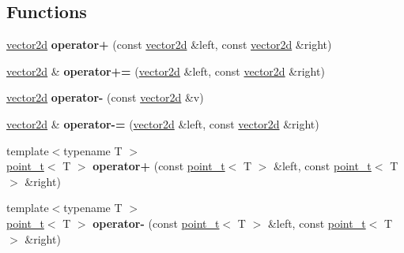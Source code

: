 \subsection*{Functions}
\begin{DoxyCompactItemize}
\item 
\mbox{\label{namespacetwod_a20bdf2e9aa199bd27066feded5ebbf88}} 
\hyperlink{structtwod_1_1vector2d}{vector2d} {\bfseries operator+} (const \hyperlink{structtwod_1_1vector2d}{vector2d} \&left, const \hyperlink{structtwod_1_1vector2d}{vector2d} \&right)
\item 
\mbox{\label{namespacetwod_a88611ca0a2ee33cdb28b9aa680c8ac7a}} 
\hyperlink{structtwod_1_1vector2d}{vector2d} \& {\bfseries operator+=} (\hyperlink{structtwod_1_1vector2d}{vector2d} \&left, const \hyperlink{structtwod_1_1vector2d}{vector2d} \&right)
\item 
\mbox{\label{namespacetwod_aeb9c36dcd91a604afbaf4ebd5bf5d87a}} 
\hyperlink{structtwod_1_1vector2d}{vector2d} {\bfseries operator-\/} (const \hyperlink{structtwod_1_1vector2d}{vector2d} \&v)
\item 
\mbox{\label{namespacetwod_a77886f4b682176b0bdd398698ae33a69}} 
\hyperlink{structtwod_1_1vector2d}{vector2d} \& {\bfseries operator-\/=} (\hyperlink{structtwod_1_1vector2d}{vector2d} \&left, const \hyperlink{structtwod_1_1vector2d}{vector2d} \&right)
\item 
\mbox{\label{namespacetwod_af5b35a3141bd36fce0545de2e044982d}} 
{\footnotesize template$<$typename T $>$ }\\\hyperlink{structtwod_1_1point__t}{point\+\_\+t}$<$ T $>$ {\bfseries operator+} (const \hyperlink{structtwod_1_1point__t}{point\+\_\+t}$<$ T $>$ \&left, const \hyperlink{structtwod_1_1point__t}{point\+\_\+t}$<$ T $>$ \&right)
\item 
\mbox{\label{namespacetwod_a2045a121a853ade1267e2960db7d086d}} 
{\footnotesize template$<$typename T $>$ }\\\hyperlink{structtwod_1_1point__t}{point\+\_\+t}$<$ T $>$ {\bfseries operator-\/} (const \hyperlink{structtwod_1_1point__t}{point\+\_\+t}$<$ T $>$ \&left, const \hyperlink{structtwod_1_1point__t}{point\+\_\+t}$<$ T $>$ \&right)
\item 

\end{DoxyCompactItemize}
